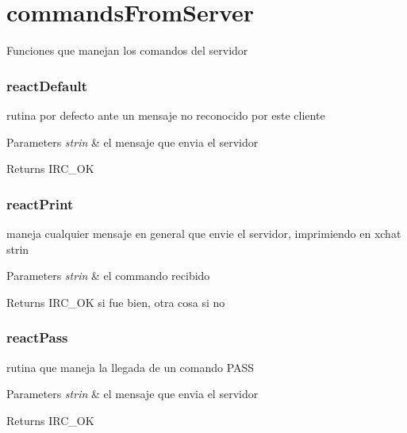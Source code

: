 \hypertarget{group___i_r_c_commands_from_server}{\section{commands\-From\-Server}
\label{group___i_r_c_commands_from_server}
}
Funciones que manejan los comandos del servidor



 \hypertarget{reactDefault}{}\subsubsection{react\-Default}\label{reactDefault}
rutina por defecto ante un mensaje no reconocido por este cliente


\begin{DoxyParams}{Parameters}
{\em strin} & el mensaje que envia el servidor\\
\hline
\end{DoxyParams}
\begin{DoxyReturn}{Returns}
I\-R\-C\-\_\-\-O\-K
\end{DoxyReturn}


 \hypertarget{reactPrint}{}\subsubsection{react\-Print}\label{reactPrint}
maneja cualquier mensaje en general que envie el servidor, imprimiendo en xchat strin


\begin{DoxyParams}{Parameters}
{\em strin} & el commando recibido\\
\hline
\end{DoxyParams}
\begin{DoxyReturn}{Returns}
I\-R\-C\-\_\-\-O\-K si fue bien, otra cosa si no
\end{DoxyReturn}


 \hypertarget{reactPass}{}\subsubsection{react\-Pass}\label{reactPass}
rutina que maneja la llegada de un comando P\-A\-S\-S


\begin{DoxyParams}{Parameters}
{\em strin} & el mensaje que envia el servidor\\
\hline
\end{DoxyParams}
\begin{DoxyReturn}{Returns}
I\-R\-C\-\_\-\-O\-K
\end{DoxyReturn}


